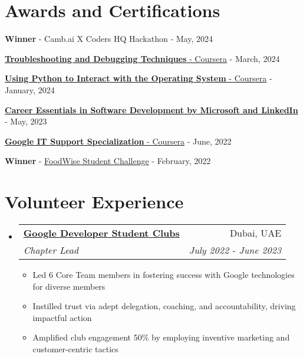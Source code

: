 \documentclass[a4paper,20pt]{article}
\makeatletter
\newcommand{\resumeItemWithoutTitle}[1] {
	\item\small{
		{#1 \vspace{-2pt}}
	}
}
\newcommand{\resumeSubheading}[4] {
	\vspace{-1pt}\item
	\begin{tabular*}{0.97\textwidth}{l@{\extracolsep{\fill}}r}
		\textbf{#1} & #2 \\
		\textit{#3} & \textit{#4} \\
	\end{tabular*}\vspace{-5pt}
}
\newcommand{\resumeSubHeadingListStart}{\begin{itemize}[leftmargin=*]}
\newcommand{\resumeSubHeadingListEnd}{\end{itemize}}
\newcommand{\resumeItemListStart}{\begin{itemize}}
\newcommand{\resumeItemListEnd}{\end{itemize}\vspace{-5pt}}
\makeatother
\begin{document}
\section{Awards and Certifications}
\begin{description}[font=$\bullet$]
	\item {\textbf{Winner} - Camb.ai X Coders HQ Hackathon - May, 2024}
	\vspace{-5pt}
	\item {\href{https://coursera.org/verify/QKYV5VQSSVMD}{\textbf{Troubleshooting and Debugging Techniques} - Coursera} - March, 2024}
	\vspace{-5pt}
	\item {\href{https://coursera.org/verify/GV5ZH7QBJP83}{\textbf{Using Python to Interact with the Operating System} - Coursera} - January, 2024}
	\vspace{-5pt}
	\item {\href{https://www.linkedin.com/learning/certificates/89ecc674e4f0587a88390cc07ce509093d8b63cd8bcb02e3fd833e966bba7ea8}{\textbf{Career Essentials in Software Development by Microsoft and LinkedIn}} - May, 2023}
	\vspace{-5pt}
	\item {\href{https://coursera.org/verify/professional-cert/KXSX89ULVN5F}{\textbf{Google IT Support Specialization} - Coursera} - June, 2022}
	\vspace{-5pt}
	\item {\textbf{Winner} - \href{https://www.foodforfuturesummit.com/foodwise}{FoodWise Student Challenge} - February, 2022}
	\vspace{-5pt}

\end{description}
\vspace{2pt}

\section{Volunteer Experience}
	\resumeSubHeadingListStart
		\resumeSubheading{\href{https://gdsc.community.dev/heriot-watt-university/}{Google Developer Student Clubs}}{Dubai, UAE}{Chapter Lead}{July 2022 - June 2023}
		\resumeItemListStart
			\resumeItemWithoutTitle{Led 6 Core Team members in fostering success with Google technologies for diverse members}
			\resumeItemWithoutTitle{Instilled trust via adept delegation, coaching, and accountability, driving impactful action}
			\resumeItemWithoutTitle{Amplified club engagement 50\% by employing inventive marketing and customer-centric tactics}
		\resumeItemListEnd
	\resumeSubHeadingListEnd

\vspace{-5pt}
\end{document}
